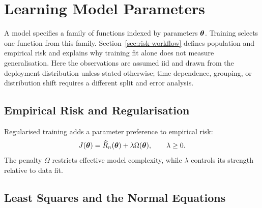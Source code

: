 

\section{Learning Model Parameters}

A model specifies a family of functions indexed by parameters $\bm{\theta}$.
Training selects one function from this family. Section~\ref{sec:risk-workflow}
defines population and empirical risk and explains why training fit alone does
not measure generalisation. Here the observations are assumed iid and drawn from
the deployment distribution unless stated otherwise; time dependence, grouping,
or distribution shift requires a different split and error analysis.

\subsection{Empirical Risk and Regularisation}

Regularised training adds a parameter preference to empirical risk:
\[
  J(\bm{\theta})
  =\widehat R_n(\bm{\theta})+\lambda\Omega(\bm{\theta}),
  \qquad \lambda\geq 0.
\]
The penalty $\Omega$ restricts effective model complexity, while $\lambda$ controls its strength relative to data fit.

\subsection{Least Squares and the Normal Equations}
\label{sec:least-squares}

